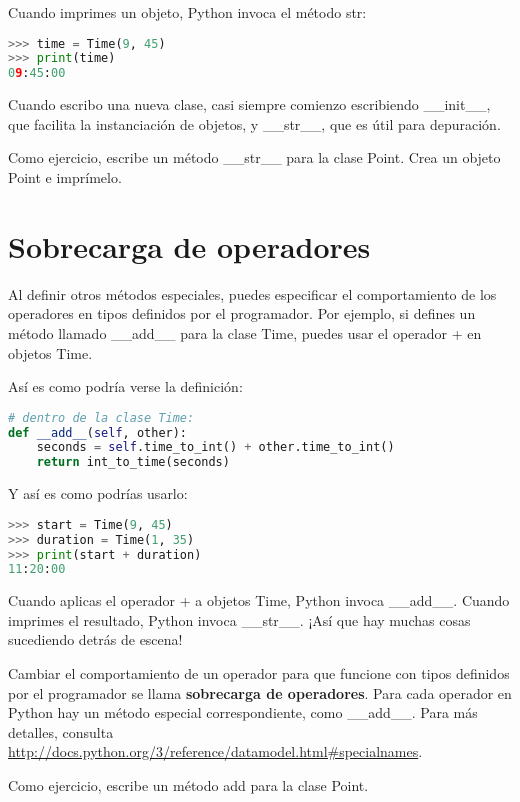 Cuando imprimes un objeto, Python invoca el método str:

\begin{lstlisting}[language=Python]
>>> time = Time(9, 45)
>>> print(time)
09:45:00
\end{lstlisting}

Cuando escribo una nueva clase, casi siempre comienzo escribiendo \_\_init\_\_, que facilita la instanciación de objetos, y \_\_str\_\_, que es útil para depuración.

Como ejercicio, escribe un método \_\_str\_\_ para la clase Point. Crea un objeto Point e imprímelo.

\section{Sobrecarga de operadores}

Al definir otros métodos especiales, puedes especificar el comportamiento de los operadores en tipos definidos por el programador. Por ejemplo, si defines un método llamado \_\_add\_\_ para la clase Time, puedes usar el operador + en objetos Time.

Así es como podría verse la definición:

\begin{lstlisting}[language=Python]
# dentro de la clase Time:
def __add__(self, other):
    seconds = self.time_to_int() + other.time_to_int()
    return int_to_time(seconds)
\end{lstlisting}

Y así es como podrías usarlo:

\begin{lstlisting}[language=Python]
>>> start = Time(9, 45)
>>> duration = Time(1, 35)
>>> print(start + duration)
11:20:00
\end{lstlisting}

Cuando aplicas el operador + a objetos Time, Python invoca \_\_add\_\_. Cuando imprimes el resultado, Python invoca \_\_str\_\_. ¡Así que hay muchas cosas sucediendo detrás de escena!

Cambiar el comportamiento de un operador para que funcione con tipos definidos por el programador se llama \textbf{sobrecarga de operadores}. Para cada operador en Python hay un método especial correspondiente, como \_\_add\_\_. Para más detalles, consulta \url{http://docs.python.org/3/reference/datamodel.html#specialnames}.

Como ejercicio, escribe un método add para la clase Point.

